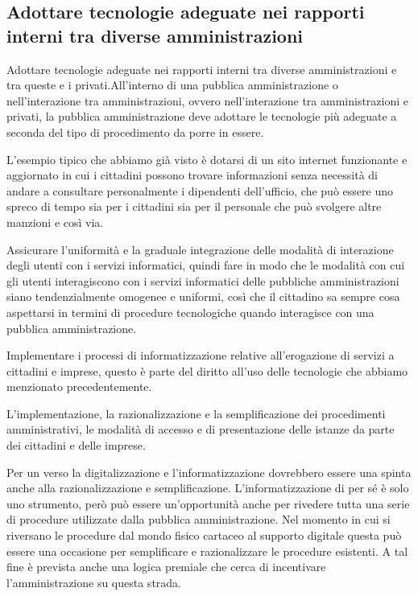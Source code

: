 \subsection{Adottare tecnologie adeguate nei rapporti interni tra diverse amministrazioni}

Adottare tecnologie adeguate nei rapporti interni tra diverse amministrazioni e tra queste e i privati.All'interno di una pubblica amministrazione o nell'interazione tra amministrazioni, ovvero nell'interazione tra amministrazioni e privati, la pubblica amministrazione deve adottare le tecnologie più adeguate  a seconda del tipo di procedimento da porre in essere. 

L'esempio tipico che abbiamo già visto è dotarsi di un sito internet funzionante e aggiornato in cui i cittadini possono trovare informazioni senza necessità di andare a consultare personalmente i dipendenti dell'ufficio, che può essere uno spreco di tempo sia per i cittadini sia per il personale che può svolgere altre manzioni e così via. 

Assicurare l'uniformità e la graduale integrazione delle modalità di interazione degli utenti con i servizi informatici, quindi fare in modo che le modalità con cui gli utenti interagiscono con i servizi informatici delle pubbliche amministrazioni siano tendenzialmente omogenee e uniformi, così che il cittadino sa sempre cosa aspettarsi in termini di procedure tecnologiche quando interagisce con una pubblica amministrazione. 

Implementare i processi di informatizzazione relative all'erogazione di servizi a cittadini e imprese, questo è parte del diritto all'uso delle tecnologie che abbiamo menzionato precedentemente. 

L'implementazione, la razionalizzazione e la semplificazione dei procedimenti amministrativi, le modalità di accesso e di presentazione delle istanze da parte dei cittadini e delle imprese.

Per un verso la digitalizzazione e l'informatizzazione dovrebbero essere una spinta anche alla razionalizzazione e semplificazione. L'informatizzazione di per sé è solo uno strumento, però può essere un'opportunità anche per rivedere tutta una serie di procedure utilizzate dalla pubblica amministrazione. Nel momento in cui si riversano le procedure dal mondo fisico cartaceo al supporto digitale questa può essere una occasione per semplificare e razionalizzare le procedure esistenti. A tal fine è prevista anche una logica premiale che cerca di incentivare l'amministrazione su questa strada. 


